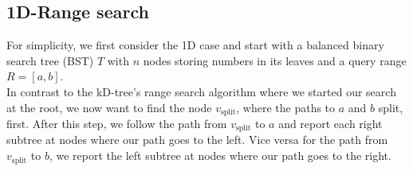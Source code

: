     \subsection{1D-Range search}
        For simplicity, we first consider the 1D case and start with a balanced binary search tree (BST) $T$ with $n$ nodes storing numbers in its leaves and a query range $R = [a, b]$. \\
        In contrast to the kD-tree's range search algorithm where we started our search at the root, we now want to find the node $v_\text{split}$, where the paths to $a$ and $b$ split, first. After this step, we follow the path from $v_\text{split}$ to $a$ and report each right subtree at nodes where our path goes to the left. Vice versa for the path from $v_\text{split}$ to $b$, we report the left subtree at nodes where our path goes to the right. 

